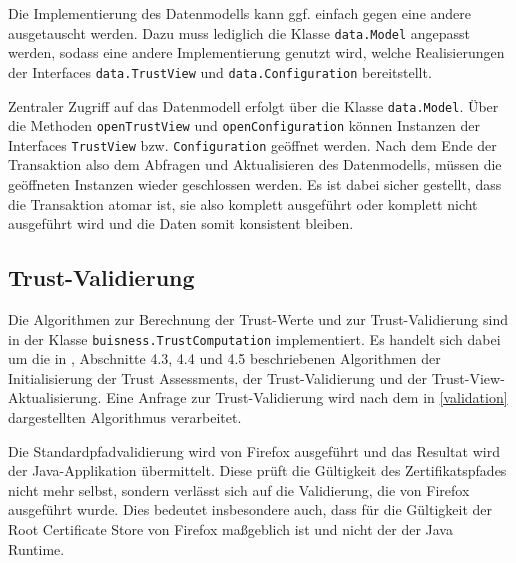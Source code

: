 \documentclass[accentcolor=tud1c,article,colorback,11pt]{tudreport}
\begin{document}
Die Implementierung des Datenmodells kann ggf. einfach gegen eine andere ausgetauscht werden. Dazu muss lediglich die Klasse \texttt{data.Model} angepasst werden, sodass eine andere Implementierung genutzt wird, welche Realisierungen der Interfaces \texttt{data.TrustView} und \texttt{data.Configuration} bereitstellt.

Zentraler Zugriff auf das Datenmodell erfolgt über die Klasse \texttt{data.Model}. Über die Methoden \texttt{openTrustView} und \texttt{openConfiguration} können Instanzen der Interfaces \texttt{TrustView} bzw. \texttt{Configuration} geöffnet werden. Nach dem Ende der Transaktion also dem Abfragen und Aktualisieren des Datenmodells, müssen die geöffneten Instanzen wieder geschlossen werden. Es ist dabei sicher gestellt, dass die Transaktion atomar ist, sie also komplett ausgeführt oder komplett nicht ausgeführt wird und die Daten somit konsistent bleiben.

\subsection{Trust-Validierung}

Die Algorithmen zur Berechnung der Trust-Werte und zur Trust-Validierung sind in der Klasse \texttt{buisness.TrustComputation} implementiert. Es handelt sich dabei um die in \cite{braun2013trust}, Abschnitte 4.3, 4.4 und 4.5 beschriebenen Algorithmen der Initialisierung der Trust Assessments, der Trust-Validierung und der Trust-View-Aktualisierung. Eine Anfrage zur Trust-Validierung wird nach dem in \cref{validation} dargestellten Algorithmus verarbeitet.

Die Standardpfadvalidierung wird von Firefox ausgeführt und das Resultat wird der Java-Applikation übermittelt. Diese prüft die Gültigkeit des Zertifikatspfades nicht mehr selbst, sondern verlässt sich auf die Validierung, die von Firefox ausgeführt wurde. Dies bedeutet insbesondere auch, dass für die Gültigkeit der Root Certificate Store von Firefox maßgeblich ist und nicht der der Java Runtime.
\end{document}
